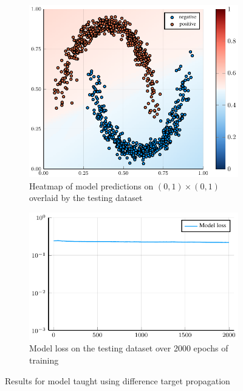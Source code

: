 \begin{figure}
	\centering
	\begin{subfigure}{0.49\textwidth}
		\centering
		\includegraphics[width=\textwidth]{images/difftargetprop-heatmap/difftargetprop.pdf}
		\caption{Heatmap of model predictions on \( \left( 0, 1 \right) \times \left( 0, 1 \right) \) overlaid by the testing dataset}
	\end{subfigure}
	\begin{subfigure}{0.49\textwidth}
		\centering
		\includegraphics[width=\textwidth]{images/difftargetprop-modelloss/difftargetprop.pdf}
		\caption{Model loss on the testing dataset over 2000 epochs of training}
	\end{subfigure}
	\caption{Results for model taught using difference target propagation}\label{difftargetprop}
\end{figure}

